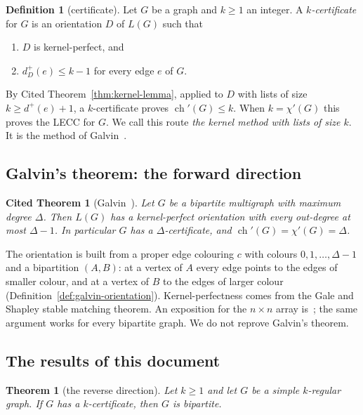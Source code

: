 \documentclass[11pt]{article}
\theoremstyle{plain}
\newtheorem{citedtheorem}[theorem]{Cited Theorem}
\newtheorem{maintheorem}{Theorem}
\theoremstyle{definition}
\newtheorem{definition}[theorem]{Definition}
\theoremstyle{remark}
\newcommand{\LG}{L(G)}
\newcommand{\dout}{d^{+}}
\newcommand{\chil}{\operatorname{ch}'}
\newcommand{\chie}{\chi'}
\begin{document}
\begin{definition}[certificate]\label{def:certificate}
Let $G$ be a graph and $k\ge 1$ an integer. A \emph{$k$-certificate} for $G$ is an orientation
$D$ of $\LG$ such that
\begin{enumerate}[label=(C\arabic*)]
  \item $D$ is kernel-perfect, and
  \item $\dout_D(e)\le k-1$ for every edge $e$ of $G$.
\end{enumerate}
\end{definition}

By Cited Theorem~\ref{thm:kernel-lemma}, applied to $D$ with lists of size $k\ge\dout(e)+1$, a
$k$-certificate proves $\chil(G)\le k$. When $k=\chie(G)$ this proves the LECC for $G$. We call
this route \emph{the kernel method with lists of size $k$}. It is the method of
Galvin~\cite{galvin}.

\subsection{Galvin's theorem: the forward direction}

\begin{citedtheorem}[Galvin~\cite{galvin}]\label{thm:galvin}
Let $G$ be a bipartite multigraph with maximum degree $\Delta$. Then $\LG$ has a kernel-perfect
orientation with every out-degree at most $\Delta-1$. In particular $G$ has a
$\Delta$-certificate, and $\chil(G)=\chie(G)=\Delta$.
\end{citedtheorem}

The orientation is built from a proper edge colouring $c$ with colours $0,1,\dots,\Delta-1$ and
a bipartition $(A,B)$: at a vertex of $A$ every edge points to the edges of smaller colour, and
at a vertex of $B$ to the edges of larger colour (Definition~\ref{def:galvin-orientation}).
Kernel-perfectness comes from the Gale and Shapley stable matching theorem. An exposition for
the $n\times n$ array is~\cite[Chapter~33]{book}; the same argument works for every bipartite
graph. We do not reprove Galvin's theorem.

\subsection{The results of this document}

\begin{maintheorem}[the reverse direction]\label{thm:main}
Let $k\ge 1$ and let $G$ be a simple $k$-regular graph. If $G$ has a $k$-certificate, then $G$
is bipartite.
\end{maintheorem}
\end{document}

